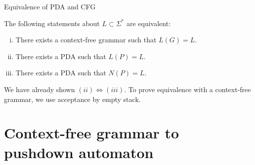 \documentclass[handout]{beamer}
\begin{document}
\begin{frame}{Equivalence of PDA and CFG}

    \begin{theorem}
        The following statements about $L\subset\Sigma^*$ are equivalent:
        \begin{enumerate}[(i)]
            \item There exists a context-free grammar such that $L(G)=L$.
            \item There exists a PDA such that $L(P)=L$.
            \item There exists a PDA such that $N(P)=L$.
        \end{enumerate}
    \end{theorem}
        
    \begin{center}
    \end{center}

    We have already shown $(ii)\Leftrightarrow(iii)$. To prove equivalence with a context-free grammar, we use acceptance by empty stack.

\end{frame}


\section*{Context-free grammar to pushdown automaton}
\end{document}
